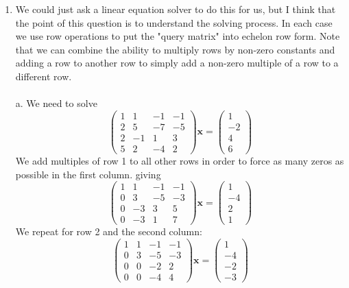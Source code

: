 \documentclass{article}
\newcommand{\chapternumber}{2}
\newenvironment{QandA}{\begin{enumerate}[label=\chapternumber.\arabic*]\bfseries\boldmath}
	{\end{enumerate}}
\newenvironment{answered}{\par\bigskip\normalfont\unboldmath}{}
\begin{document}
\begin{QandA}
		\item
		\begin{answered}
			We could just ask a linear equation solver to do this for us, but I think that the point of this question is to understand the solving process. In each case we use row operations to put the "query matrix" into echelon row form. Note that we can combine the ability to multiply rows by non-zero constants and adding a row to another row to simply add a non-zero multiple of a row to a different row.\\
			\\
			a. We need to solve
			\[\begin{pmatrix}
				1 & 1 & -1 & -1\\
				2 & 5 & -7 & -5\\
				2 & -1 & 1 & 3\\
				5 & 2 & -4 & 2
			\end{pmatrix}\textbf{x}
			=
			\begin{pmatrix}
				1\\
				-2\\
				4\\
				6
			\end{pmatrix}\]
			We add multiples of row 1 to all other rows in order to force as many zeros as possible in the first column. giving
				\[\begin{pmatrix}
				1 & 1 & -1 & -1\\
				0 & 3 & -5 & -3\\
				0 & -3 & 3 & 5\\
				0 & -3 & 1 & 7
			\end{pmatrix}\textbf{x}
			=
			\begin{pmatrix}
				1\\
				-4\\
				2\\
				1
			\end{pmatrix}\]
			We repeat for row 2 and the second column:
			\[\begin{pmatrix}
				1 & 1 & -1 & -1\\
				0 & 3 & -5 & -3\\
				0 & 0 & -2 & 2\\
				0 & 0 & -4 & 4
			\end{pmatrix}\textbf{x}
			=
			\begin{pmatrix}
				1\\
				-4\\
				-2\\
				-3
			\end{pmatrix}\]

\end{answered}
\end{QandA}
\end{document}
